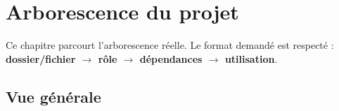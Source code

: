 \documentclass[11pt,a4paper]{report}
\newcommand{\arrowto}{\ensuremath{\rightarrow}}
\begin{document}
\chapter{Arborescence du projet}
\label{ch:arbo}

Ce chapitre parcourt l'arborescence réelle. Le format demandé est respecté :
\textbf{dossier/fichier \arrowto{} rôle \arrowto{} dépendances \arrowto{}
utilisation}.

\section{Vue générale}
\end{document}
